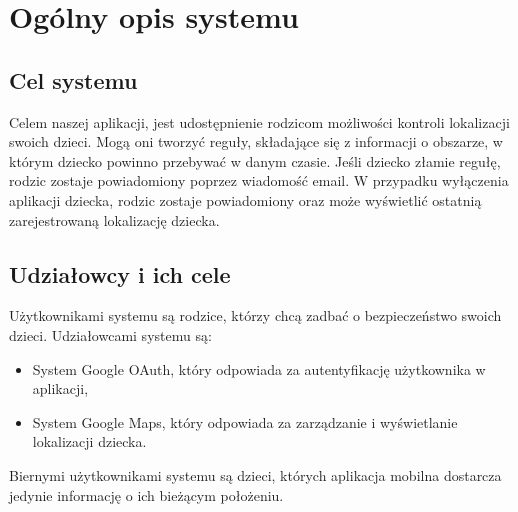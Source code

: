 \documentclass{sprawozdanie-agh}
\begin{document}
   


	\stronatytulowa{}

	\section{Ogólny opis systemu}

		\subsection{Cel systemu}

			Celem naszej aplikacji, jest udostępnienie rodzicom możliwości kontroli lokalizacji swoich dzieci. Mogą oni tworzyć reguły, składające się z informacji o obszarze, w którym dziecko powinno przebywać w danym czasie. Jeśli dziecko złamie regułę, rodzic zostaje powiadomiony poprzez wiadomość email. W przypadku wyłączenia aplikacji dziecka, rodzic zostaje powiadomiony oraz może wyświetlić ostatnią zarejestrowaną lokalizację dziecka.

		\subsection{Udziałowcy i ich cele}

			Użytkownikami systemu są rodzice, którzy chcą zadbać o bezpieczeństwo swoich dzieci. Udziałowcami systemu są:

			\begin{itemize}
				\item System Google OAuth, który odpowiada za autentyfikację użytkownika w aplikacji,
				\item System Google Maps, który odpowiada za zarządzanie i wyświetlanie lokalizacji dziecka.
			\end{itemize}
			Biernymi użytkownikami systemu są dzieci, których aplikacja mobilna dostarcza jedynie informację o ich bieżącym położeniu.
\end{document}
